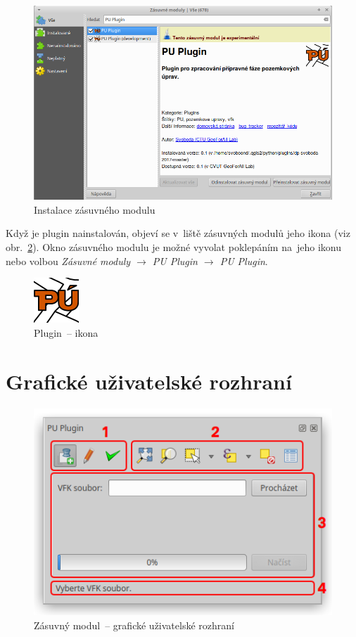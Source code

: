 	\begin{figure}[H]
		\centering
		\includegraphics[width=.8\textwidth]{./pictures/instalace_puplugin.png}
		\caption[Instalace zásuvného modulu]{Instalace zásuvného modulu}
		\label{fig:instalace_puplugin}
 	\end{figure}

Když je plugin nainstalován, objeví se v~liště zásuvných modulů jeho ikona (viz obr.~\ref{fig:ikona_puplugin}). Okno zásuvného modulu je možné vyvolat poklepáním na~jeho ikonu nebo volbou \textit{Zásuvné moduly $\rightarrow$ PU Plugin $\rightarrow$ PU Plugin}.

	\begin{figure}[H]
		\centering
		\includegraphics[width=.1\textwidth]{./pictures/puplugin.png}
		\caption[Plugin~– ikona]{Plugin~– ikona}
		\label{fig:ikona_puplugin}
 	\end{figure}

\section{Grafické uživatelské rozhraní}
\label{manual_gui}

	\begin{figure}[H]
		\centering
		\includegraphics[width=.55\textwidth]{./pictures/main_gui.png}
		\caption[Zásuvný modul~– grafické uživatelské rozhraní]{Zásuvný modul~– grafické uživatelské rozhraní}
		\label{fig:manual_main_gui}
 	\end{figure}


